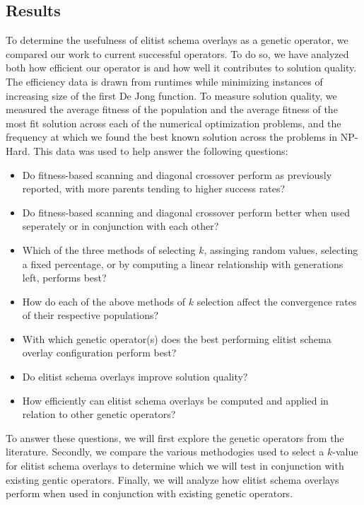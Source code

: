 \subsection*{Results}
To determine the usefulness of elitist schema overlays as a genetic operator, we compared our work to current successful operators. To do so, we have analyzed both how efficient our operator is and how well it contributes to solution quality. The efficiency data is drawn from runtimes while minimizing instances of increasing size of the first De Jong function. To measure solution quality, we measured the average fitness of the population and the average fitness of the most fit solution across each of the numerical optimization problems, and the frequency at which we found the best known solution across the problems in NP-Hard. This data was used to help answer the following questions:

\begin{itemize}
\item Do fitness-based scanning and diagonal crossover perform as previously reported, with more parents tending to higher success rates?
\item Do fitness-based scanning and diagonal crossover perform better when used seperately or in conjunction with each other? 
\item Which of the three methods of selecting $k$, assinging random values, selecting a fixed percentage, or by computing a linear relationship with generations left, performs best?
\item How do each of the above methods of $k$ selection affect the convergence rates of their respective populations?
\item With which genetic operator(s) does the best performing elitist schema overlay configuration perform best?
\item Do elitist schema overlays improve solution quality?
\item How efficiently can elitist schema overlays be computed and applied in relation to other genetic operators?
\end{itemize}

To answer these questions, we will first explore the genetic operators from the literature. Secondly, we compare the various methodogies used to select a $k$-value for elitist schema overlays to determine which we will test in conjunction with existing gentic operators. Finally, we will analyze how elitist schema overlays perform when used in conjunction with existing genetic operators.


